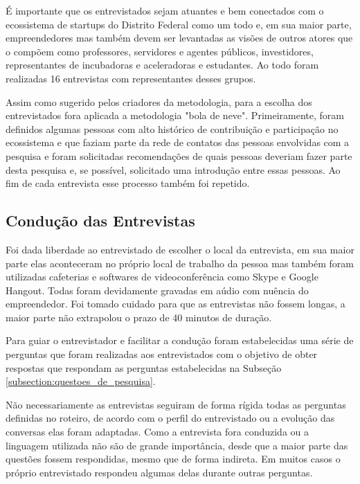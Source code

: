É importante que os entrevistados sejam atuantes e bem conectados com o ecossistema de startups do Distrito Federal como um todo e, em sua maior parte, empreendedores mas também devem ser levantadas as visões de outros atores que o compõem como professores, servidores e agentes públicos, investidores, representantes de incubadoras e aceleradoras e estudantes. Ao todo foram realizadas 16 entrevistas com representantes desses grupos.

Assim como sugerido pelos criadores da metodologia, para a escolha dos entrevistados fora aplicada a metodologia "bola de neve". Primeiramente, foram definidos algumas pessoas com alto histórico de contribuição e participação no ecossistema e que faziam parte da rede de contatos das pessoas envolvidas com a pesquisa e foram solicitadas recomendações de quais pessoas deveriam fazer parte desta pesquisa e, se possível, solicitado uma introdução entre essas pessoas. Ao fim de cada entrevista esse processo também foi repetido.

\subsection{Condução das Entrevistas}
\label{subsection:conducao_das_entrevistas}

Foi dada liberdade ao entrevistado de escolher o local da entrevista, em sua maior parte elas aconteceram no próprio local de trabalho da pessoa mas também foram utilizadas cafeterias e softwares de videoconferência como Skype e Google Hangout. Todas foram devidamente gravadas em aúdio com nuência do empreendedor. Foi tomado cuidado para que as entrevistas não fossem longas, a maior parte não extrapolou o prazo de 40 minutos de duração. 

Para guiar o entrevistador e facilitar a condução foram estabelecidas uma série de perguntas que foram realizadas aos entrevistados com o objetivo de obter respostas que respondam as perguntas estabelecidas na Subseção \ref{subsection:questoes_de_pesquisa}.

Não necessariamente as entrevistas seguiram de forma rígida todas as perguntas definidas no roteiro, de acordo com o perfil do entrevistado ou a evolução das conversas elas foram adaptadas. Como a entrevista fora conduzida ou a linguagem utilizada não são de grande importância, desde que a maior parte das questões fossem respondidas, mesmo que de forma indireta. Em muitos casos o próprio entrevistado respondeu algumas delas durante outras perguntas. 


